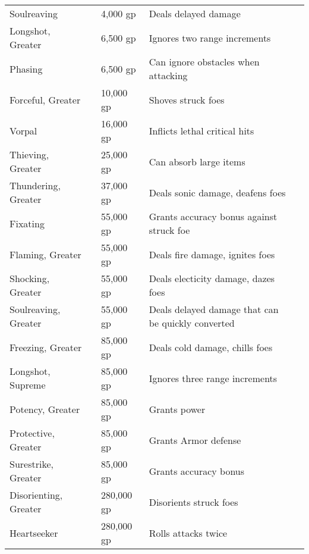 \begin{longtabuwrapper}
\begin{longtabu}{l l l X l}
Soulreaving &  & 4,000 gp & Deals delayed damage & \pageref{item:Soulreaving} \\
Longshot, Greater &  & 6,500 gp & Ignores two range increments & \pageref{item:Longshot, Greater} \\
Phasing &  & 6,500 gp & Can ignore obstacles when attacking & \pageref{item:Phasing} \\
Forceful, Greater &  & 10,000 gp & Shoves struck foes & \pageref{item:Forceful, Greater} \\
Vorpal &  & 16,000 gp & Inflicts lethal critical hits & \pageref{item:Vorpal} \\
Thieving, Greater &  & 25,000 gp & Can absorb large items & \pageref{item:Thieving, Greater} \\
Thundering, Greater &  & 37,000 gp & Deals sonic damage, deafens foes & \pageref{item:Thundering, Greater} \\
Fixating &  & 55,000 gp & Grants accuracy bonus against struck foe & \pageref{item:Fixating} \\
Flaming, Greater &  & 55,000 gp & Deals fire damage, ignites foes & \pageref{item:Flaming, Greater} \\
Shocking, Greater &  & 55,000 gp & Deals electicity damage, dazes foes & \pageref{item:Shocking, Greater} \\
Soulreaving, Greater &  & 55,000 gp & Deals delayed damage that can be quickly converted & \pageref{item:Soulreaving, Greater} \\
Freezing, Greater &  & 85,000 gp & Deals cold damage, chills foes & \pageref{item:Freezing, Greater} \\
Longshot, Supreme &  & 85,000 gp & Ignores three range increments & \pageref{item:Longshot, Supreme} \\
Potency, Greater &  & 85,000 gp & Grants  power & \pageref{item:Potency, Greater} \\
Protective, Greater &  & 85,000 gp & Grants  Armor defense & \pageref{item:Protective, Greater} \\
Surestrike, Greater &  & 85,000 gp & Grants  accuracy bonus & \pageref{item:Surestrike, Greater} \\
Disorienting, Greater &  & 280,000 gp & Disorients struck foes & \pageref{item:Disorienting, Greater} \\
Heartseeker &  & 280,000 gp & Rolls attacks twice & \pageref{item:Heartseeker} \\
\end{longtabu}
\end{longtabuwrapper}
